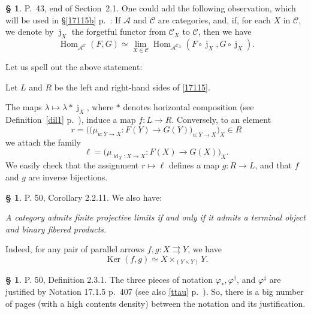 \documentclass[12pt]{article}%
\theoremstyle{remark}
\theoremstyle{definition}
\newtheorem{s}[thm]{\S}%
\newcommand{\oo}{\operatorname}
\newcommand{\A}{\mathcal A}
\newcommand{\C}{\mathcal C}
\newcommand{\parar}{\rightrightarrows}
\DeclareMathOperator{\id}{id}
\DeclareMathOperator{\Hom}{Hom}%
\DeclareMathOperator{\Ker}{Ker}
\begin{document}
\begin{s} 
P.~43, end of Section~2.1. One could add the following observation, which will be used in \S\ref{17115b} p.~\pageref{17115b}: If $\A$ and $\C$ are categories, and, if, for each $X$ in $\C$, we denote by $\oo j_X$ the forgetful functor from $\C_X$ to $\C$, then we have
%
\begin{equation}\label{17115}
\Hom_{\A^\C}(F,G)\simeq\lim_{X\in\C}\Hom_{\A^{\C_X}}(F\circ\oo j_X,G\circ\oo j_X).
\end{equation}

Let us spell out the above statement: 

Let $L$ and $R$ be the left and right-hand sides of \eqref{17115}. 

The maps $\lambda\mapsto\lambda*\oo j_X$, where $*$ denotes horizontal composition (see Definition~\ref{dil1} p.~\pageref{dil1}), induce a map $f:L\to R$. Conversely, to an element  
$$
r=\Big(\big(\mu_{u:Y\to X}:F(Y)\to G(Y)\big)_{u:Y\to X}\Big)_X\in R
$$ 
we attach the family
$$
\ell=\big(\mu_{\id_X:X\to X}:F(X)\to G(X)\big)_X.
$$ 
We easily check that the assignment $r\mapsto\ell$ defines a map $g:R\to L$, and that $f$ and $g$ are inverse bijections.
\end{s}

%

\begin{s}\label{fpl}
P. 50, Corollary 2.2.11. We also have:

\emph{A category admits finite projective limits if and only if it admits a terminal object and binary fibered products.}

Indeed, for any pair of parallel arrows $f,g:X\parar Y$, we have 
\begin{equation}\label{kfp}
\Ker(f,g)\simeq X\times_{(Y\times Y)}Y.
\end{equation}
\end{s} 

%

\begin{s}
P. 50, Definition 2.3.1. The three pieces of notation $\varphi_*,\varphi^\dagger$, and $\varphi^\ddagger$ are justified by Notation 17.1.5 p.~407 (see also \eqref{ttau} p.~\pageref{ttau}). So, there is a big number of pages (with a high contents density) between the notation and its justification.
\end{s}

%
\end{document}
